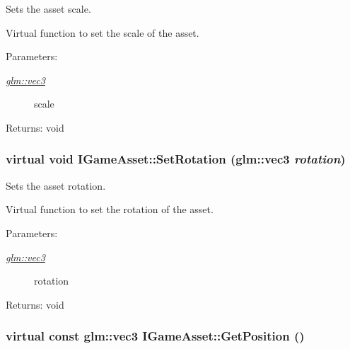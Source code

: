 Sets the asset scale. 

Virtual function to set the scale of the asset.

\begin{Desc}
\item[Parameters:]
\begin{description}
\item[{\em \hyperlink{group__core__types_g1c47e8b3386109bc992b6c48e91b0be7}{glm::vec3}}]scale \end{description}
\end{Desc}
\begin{Desc}
\item[Returns:]void \end{Desc}
\hypertarget{class_i_game_asset_46bb3a2356eb6b97bf7f5adfade662c3}{
\subsubsection[SetRotation]{\setlength{\rightskip}{0pt plus 5cm}virtual void IGameAsset::SetRotation ({\bf glm::vec3} {\em rotation})}}
\label{class_i_game_asset_46bb3a2356eb6b97bf7f5adfade662c3}


Sets the asset rotation. 

Virtual function to set the rotation of the asset.

\begin{Desc}
\item[Parameters:]
\begin{description}
\item[{\em \hyperlink{group__core__types_g1c47e8b3386109bc992b6c48e91b0be7}{glm::vec3}}]rotation \end{description}
\end{Desc}
\begin{Desc}
\item[Returns:]void \end{Desc}
\hypertarget{class_i_game_asset_d625e23f7bd5d32c41855cc72e339f10}{
\subsubsection[GetPosition]{\setlength{\rightskip}{0pt plus 5cm}virtual const {\bf glm::vec3} IGameAsset::GetPosition ()}}
\label{class_i_game_asset_d625e23f7bd5d32c41855cc72e339f10}


